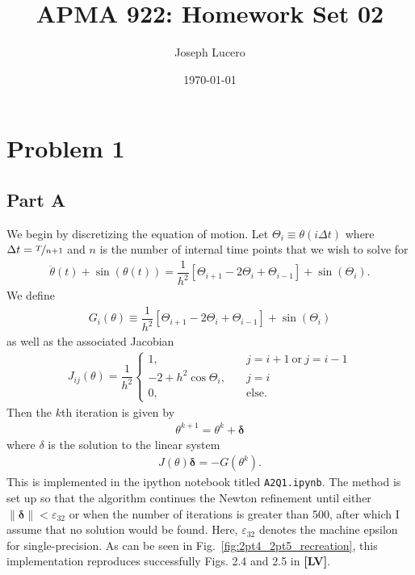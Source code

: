 \documentclass[12pt]{article}
\title{APMA 922: Homework Set 02}
\author{Joseph Lucero}
\date{\today}
\begin{document}
\maketitle

\section*{Problem 1}
\subsection*{Part A}
We begin by discretizing the equation of motion. Let $\Theta_{i} \equiv \theta(i\Delta t)$ where $\Delta t = \nicefrac{T}{n+1}$ and $n$ is the number of internal time points that we wish to solve for
\begin{align}
    \ddot{\theta}(t) + \sin(\theta(t)) = \dfrac{1}{h^{2}}\left[\Theta_{i+1}-2\Theta_{i}+ \Theta_{i-1}\right] + \sin(\Theta_{i}).
\end{align}
We define 
\begin{align}
	G_{i}(\theta) \equiv \dfrac{1}{h^{2}}\left[\Theta_{i+1}-2\Theta_{i}+ \Theta_{i-1}\right] + \sin(\Theta_{i})
\end{align}
as well as the associated Jacobian
\begin{align}
	J_{ij}(\theta) = 
	\dfrac{1}{h^{2}}
	\begin{cases}
		1,&\quad j=i+1\ \mathrm{or}\ j=i-1\\
		-2+h^{2}\cos\Theta_{i},&\quad j=i\\
		0,&\quad \mathrm{else}.
	\end{cases}
\end{align}
Then the $k$th iteration is given by 
\begin{align}
	\theta^{k+1} = \theta^{k} + \bm{\delta}
\end{align}
where $\delta$ is the solution to the linear system
\begin{align}
	J(\theta)\bm{\delta} = -G(\theta^{k}).
\end{align}
This is implemented in the ipython notebook titled \verb|A2Q1.ipynb|. The method is set up so that the algorithm continues the Newton
refinement until either $\|\bm{\delta}\| < \varepsilon_{32}$ or when the number of iterations is greater than 500, after which I assume that 
no solution would be found. Here, $\varepsilon_{32}$ denotes the machine epsilon for single-precision. As can be seen in Fig.~\ref{fig:2pt4_2pt5_recreation}, this implementation reproduces successfully Figs. 2.4 and 2.5 in \textbf{[LV]}.
\end{document}
